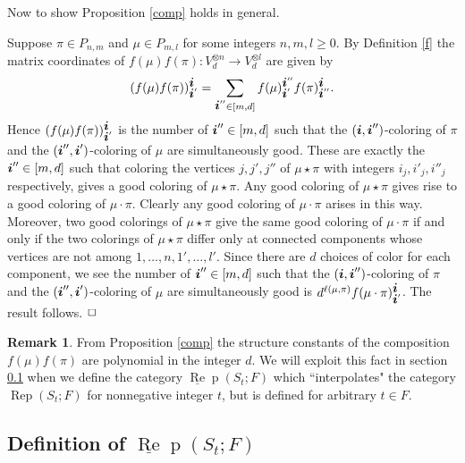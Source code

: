 \documentclass{amsart}
\def\bd#1{\mbox{\boldmath${#1}$}}
\theoremstyle{definition}
\newtheorem{remark}[theorem]{Remark}
\def\uRep{\underline{\operatorname{Re}}\!\operatorname{p}}
\newcommand{\Rep}{\operatorname{Rep}}
\renewcommand{\1}{_{(1)}}
\renewcommand{\2}{_{(2)}}
\newcommand{\3}{_{(3)}}
\newcommand{\4}{_{(4)}}
\begin{document}
Now to show Proposition \ref{comp} holds in general.

\medskip{}
 Suppose $\pi\in P_{n,m}$ and $\mu\in P_{m, l}$ for some integers $n, m, l\geq 0$.  By Definition \ref{f} the matrix coordinates of $f(\mu) f(\pi):V_d^{\otimes n}\to V_d^{\otimes l}$ are given by 
\begin{equation}\label{comp1}(f(\mu) f(\pi))_{{\bd{i}}'}^{\bd{i}}=\sum_{{\bd{i}}''\in[m,d]}f(\mu)_{{\bd{i}}'}^{{\bd{i}}''}f(\pi)_{{\bd{i}}''}^{{\bd{i}}}.\end{equation}
Hence $(f(\mu) f(\pi))_{{\bd{i}}'}^{\bd{i}}$ is the number of ${\bd{i}}''\in[m,d]$ such that the $({\bd{i}}, {\bd{i}}'')$-coloring of $\pi$ and the $({\bd{i}}'', {\bd{i}}')$-coloring of $\mu$ are simultaneously good.  These are exactly the ${\bd{i}}''\in[m,d]$ such that coloring the vertices $j, j', j''$ of $\mu\star\pi$ with integers $i_j, i'_j, i''_j$ respectively, gives a good coloring of $\mu\star\pi$.  Any good coloring of $\mu\star\pi$ gives rise to a good coloring of $\mu\cdot\pi$.  Clearly any good coloring of $\mu\cdot\pi$ arises in this way.  Moreover, two good colorings of $\mu\star\pi$ give the same good coloring of $\mu\cdot\pi$ if and only if the two colorings of $\mu\star\pi$ differ only at connected components whose vertices are not among $1,\ldots, n, 1', \ldots, l'$.  Since there are $d$ choices of color for each component, we see the number of ${\bd{i}}''\in[m, d]$ such that the $({\bd{i}}, {\bd{i}}'')$-coloring of $\pi$ and the $({\bd{i}}'', {\bd{i}}')$-coloring of $\mu$ are simultaneously good is $d^{\ell(\mu, \pi)}f(\mu\cdot\pi)_{{\bd{i}}'}^{{\bd{i}}}$.  The result follows.
$\hfill\Box$\medskip


\begin{remark} From Proposition \ref{comp} the structure constants of the composition $f(\mu)f(\pi)$ are polynomial in the integer $d$.  We will exploit this fact in section \ref{defRep} when we define the category $\uRep(S_t; F)$ which ``interpolates" the category $\Rep(S_t; F)$ for nonnegative integer $t$, but is defined for arbitrary $t\in F$.  

\end{remark}


\subsection{Definition of $\uRep(S_t; F)$}\label{defRep} 
\end{document}
